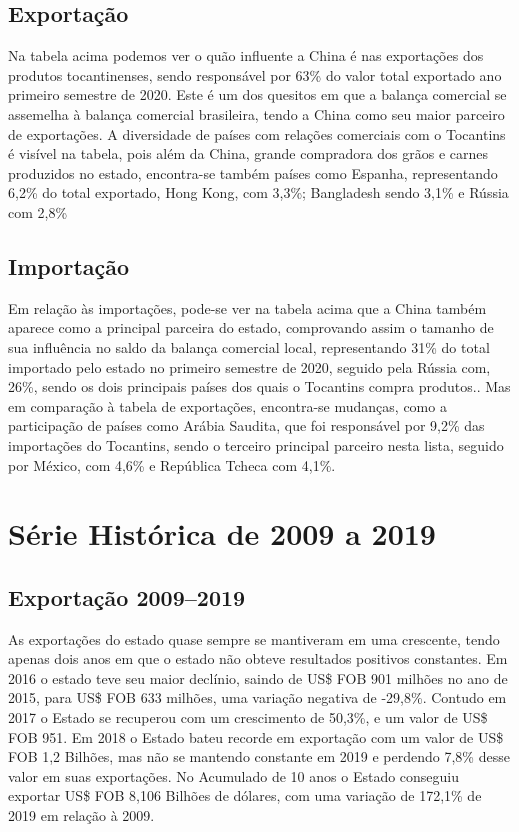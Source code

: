 \subsection {Exportação}
\par Na tabela acima podemos ver o quão influente a China é nas exportações dos produtos tocantinenses, sendo responsável por 63\% do valor total exportado ano primeiro semestre de 2020. Este é um dos quesitos em que a balança comercial se assemelha à balança comercial brasileira, tendo a China como seu maior parceiro de exportações. 
A diversidade de países com relações comerciais com o Tocantins é visível na tabela, pois além da China, grande compradora dos grãos e carnes produzidos no estado, encontra-se também países como Espanha, representando 6,2\% do total exportado, Hong Kong, com 3,3\%; Bangladesh sendo 3,1\% e Rússia com 2,8\%

\subsection {Importação}
\par Em relação às importações, pode-se ver na tabela acima que a China também aparece como a principal parceira do estado, comprovando assim o tamanho de sua influência no saldo da balança comercial local, representando 31\% do total importado pelo estado no primeiro semestre de 2020, seguido pela Rússia com, 26\%, sendo os dois principais países dos quais o Tocantins compra produtos.. Mas em comparação à tabela de exportações, encontra-se mudanças, como a participação de países como Arábia Saudita, que foi responsável por 9,2\% das importações do Tocantins, sendo o terceiro principal parceiro nesta lista, seguido por México, com 4,6\% e República Tcheca com 4,1\%.

\section{Série Histórica de 2009 a 2019}

\subsection {Exportação 2009--2019}
\par As exportações do estado quase sempre se mantiveram em uma crescente, tendo
apenas dois anos em que o estado não obteve resultados positivos constantes. Em 2016 o estado teve seu maior declínio, saindo de US\$ FOB 901 milhões no ano de 2015, para US\$ FOB 633 milhões, uma variação negativa de  -29,8\%. 
Contudo em 2017 o Estado se recuperou com um crescimento de 50,3\%, e um valor de US\$ FOB 951. Em 2018 o Estado bateu recorde em exportação com um valor de US\$ FOB 1,2 Bilhões, mas não se mantendo constante em 2019 e perdendo 7,8\% desse valor em suas exportações.
No Acumulado de 10 anos o Estado conseguiu exportar US\$ FOB 8,106 Bilhões de dólares, com uma variação de 172,1\% de 2019 em relação à 2009.

